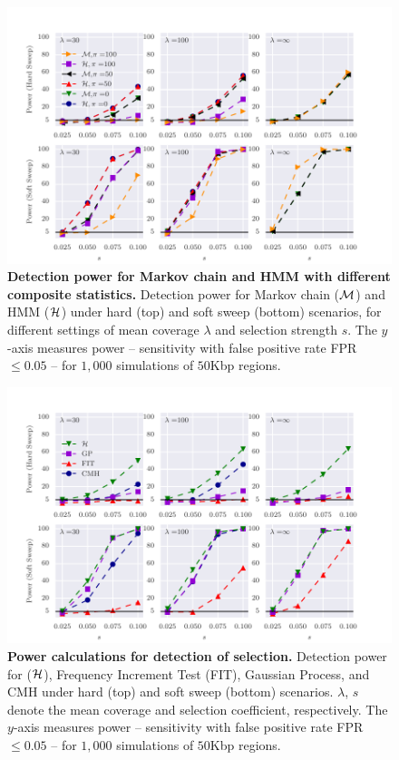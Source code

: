\documentclass[11pt]{article}
\def\comale{\text{{\sc Comale}}}
\begin{document}
\begin{figure}[H]
	\centering
	\includegraphics[width=\textwidth]{figures/powerCLR.pdf}
	\caption{{\bf Detection power for Markov chain and HMM with
            different composite statistics.}  Detection power for
          Markov chain (${\cal M}$) and HMM (${\cal H}$) under hard (top) and
          soft sweep (bottom) scenarios, for different settings of
          mean coverage $\lambda$ and selection strength $s$.  The
          $y$-axis measures power -- sensitivity with false positive
          rate FPR $\le 0.05$ -- for $1,000$ simulations of $50$Kbp
          regions.  } \label{fig:powerCLR}
\end{figure}

\begin{figure}[H]
	\centering
	\includegraphics[width=\textwidth]{figures/power.pdf}
	\caption{ {\bf Power calculations for detection of selection.}
          Detection power for \comale (${\cal H}$), Frequency Increment
          Test (FIT), Gaussian Process, and CMH under hard (top) and
          soft sweep (bottom) scenarios. $\lambda$, $s$ denote the
          mean coverage and selection coefficient, respectively. The
          $y$-axis measures power -- sensitivity with false positive
          rate FPR $\le 0.05$ -- for $1,000$ simulations of $50$Kbp
          regions. } \label{fig:power}
\end{figure}
\end{document}
